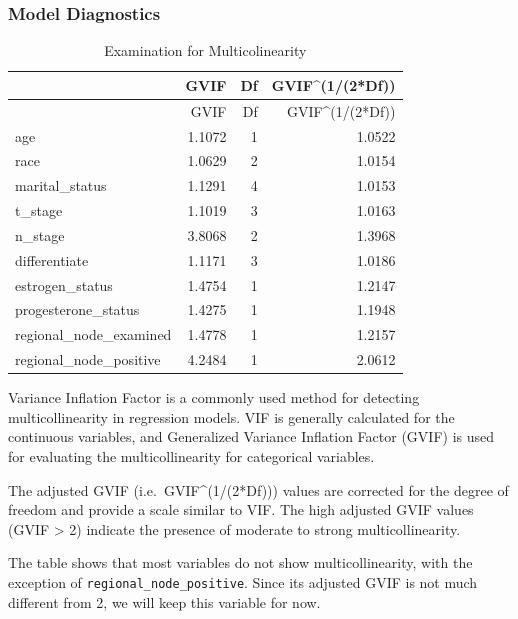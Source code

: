 \documentclass[
]{article}
\begin{document}
\subsubsection{Model Diagnostics}\label{model-diagnostics}

\begin{longtable}[]{@{}lrrr@{}}
\caption{Examination for Multicolinearity}\tabularnewline
\toprule\noalign{}
& GVIF & Df & GVIF\^{}(1/(2*Df)) \\
\midrule\noalign{}
\endfirsthead
\toprule\noalign{}
& GVIF & Df & GVIF\^{}(1/(2*Df)) \\
\midrule\noalign{}
\endhead
\bottomrule\noalign{}
\endlastfoot
age & 1.1072 & 1 & 1.0522 \\
race & 1.0629 & 2 & 1.0154 \\
marital\_status & 1.1291 & 4 & 1.0153 \\
t\_stage & 1.1019 & 3 & 1.0163 \\
n\_stage & 3.8068 & 2 & 1.3968 \\
differentiate & 1.1171 & 3 & 1.0186 \\
estrogen\_status & 1.4754 & 1 & 1.2147 \\
progesterone\_status & 1.4275 & 1 & 1.1948 \\
regional\_node\_examined & 1.4778 & 1 & 1.2157 \\
regional\_node\_positive & 4.2484 & 1 & 2.0612 \\
\end{longtable}

Variance Inflation Factor is a commonly used method for detecting
multicollinearity in regression models. VIF is generally calculated for
the continuous variables, and Generalized Variance Inflation Factor
(GVIF) is used for evaluating the multicollinearity for categorical
variables.

The adjusted GVIF (i.e.~GVIF\^{}(1/(2*Df))) values are corrected for the
degree of freedom and provide a scale similar to VIF. The high adjusted
GVIF values (GVIF \textgreater{} 2) indicate the presence of moderate to
strong multicollinearity.

The table shows that most variables do not show multicollinearity, with
the exception of \texttt{regional\_node\_positive}. Since its adjusted
GVIF is not much different from 2, we will keep this variable for now.
\end{document}
